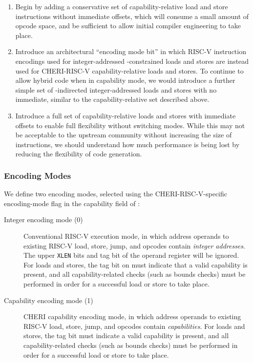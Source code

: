 \begin{enumerate}
\item Begin by adding a conservative set of capability-relative load and store
instructions without immediate offsets, which will consume a small amount of
opcode space, and be sufficient to allow initial compiler engineering to take
place.

\item Introduce an architectural ``encoding mode bit'' in which RISC-V
instruction encodings used for integer-addressed \DDC{}-constrained loads and
stores are instead used for CHERI-RISC-V capability-relative loads and stores.
To continue to allow hybrid code when in capability mode, we would introduce a
further simple set of \DDC{}-indirected integer-addressed loads and stores with
no immediate, similar to the capability-relative set described above.

\item Introduce a full set of capability-relative loads and stores
with immediate offsets to enable full flexibility without switching modes.
While this may not be acceptable to the upstream community without increasing
the size of instructions, we should understand how much performance is being
lost by reducing the flexibility of code generation.
\end{enumerate}

\subsubsection{Encoding Modes}
\label{sec:cheri-riscv-encmodes}

We define two encoding modes, selected using the CHERI-RISC-V-specific
encoding-mode flag in the capability \cflags{} field of \PCC{}:

\begin{description}
\item[Integer encoding mode (0)] Conventional RISC-V execution mode, in which
  address operands to existing RISC-V load, store, jump, and  opcodes contain
  \textit{integer addresses}.
  The upper \texttt{XLEN} bits and tag bit of
  the operand register will be ignored.
  For loads and stores, the
  tag bit on \DDC{} must indicate that a valid capability is present, and
  all capability-related checks (such as bounds checks) must be performed in
  order for a successful load or store to take place.

\item[Capability encoding mode (1)] CHERI capability encoding mode, in which address operands to
  existing RISC-V load, store, jump, and  opcodes contain \textit{capabilities}.
  For loads and stores, the tag bit must indicate a valid capability is present, and all
  capability-related checks (such as bounds checks) must be performed in order
  for a successful load or store to take place.
\end{description}

